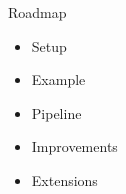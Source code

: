 \begin{frame}{Roadmap}
\begin{itemize}
\item Setup
\item Example
\item Pipeline
\item Improvements
\item Extensions
\end{itemize}
\end{frame}
